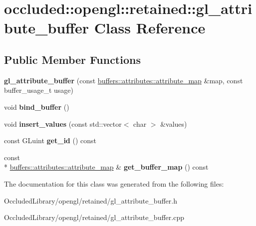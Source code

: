 \hypertarget{classoccluded_1_1opengl_1_1retained_1_1gl__attribute__buffer}{\section{occluded\+:\+:opengl\+:\+:retained\+:\+:gl\+\_\+attribute\+\_\+buffer Class Reference}
\label{classoccluded_1_1opengl_1_1retained_1_1gl__attribute__buffer}
}
\subsection*{Public Member Functions}
\begin{DoxyCompactItemize}
\item 
\hypertarget{classoccluded_1_1opengl_1_1retained_1_1gl__attribute__buffer_afde90951c4cebabd6a6d80e5a7027cf0}{{\bfseries gl\+\_\+attribute\+\_\+buffer} (const \hyperlink{classoccluded_1_1buffers_1_1attributes_1_1attribute__map}{buffers\+::attributes\+::attribute\+\_\+map} \&map, const buffer\+\_\+usage\+\_\+t usage)}\label{classoccluded_1_1opengl_1_1retained_1_1gl__attribute__buffer_afde90951c4cebabd6a6d80e5a7027cf0}

\item 
\hypertarget{classoccluded_1_1opengl_1_1retained_1_1gl__attribute__buffer_ab9c701de489d6e8b7ece70f4ffd50ca1}{void {\bfseries bind\+\_\+buffer} ()}\label{classoccluded_1_1opengl_1_1retained_1_1gl__attribute__buffer_ab9c701de489d6e8b7ece70f4ffd50ca1}

\item 
\hypertarget{classoccluded_1_1opengl_1_1retained_1_1gl__attribute__buffer_a07b2603386742c0f9b3d0115842b5ed5}{void {\bfseries insert\+\_\+values} (const std\+::vector$<$ char $>$ \&values)}\label{classoccluded_1_1opengl_1_1retained_1_1gl__attribute__buffer_a07b2603386742c0f9b3d0115842b5ed5}

\item 
\hypertarget{classoccluded_1_1opengl_1_1retained_1_1gl__attribute__buffer_ac2c3be30814ed6daec32533aacf8e52b}{const G\+Luint {\bfseries get\+\_\+id} () const }\label{classoccluded_1_1opengl_1_1retained_1_1gl__attribute__buffer_ac2c3be30814ed6daec32533aacf8e52b}

\item 
\hypertarget{classoccluded_1_1opengl_1_1retained_1_1gl__attribute__buffer_a812a8329c763d45760128b71fa76c5e7}{const \\*
\hyperlink{classoccluded_1_1buffers_1_1attributes_1_1attribute__map}{buffers\+::attributes\+::attribute\+\_\+map} \& {\bfseries get\+\_\+buffer\+\_\+map} () const }\label{classoccluded_1_1opengl_1_1retained_1_1gl__attribute__buffer_a812a8329c763d45760128b71fa76c5e7}

\end{DoxyCompactItemize}


The documentation for this class was generated from the following files\+:\begin{DoxyCompactItemize}
\item 
Occluded\+Library/opengl/retained/gl\+\_\+attribute\+\_\+buffer.\+h\item 
Occluded\+Library/opengl/retained/gl\+\_\+attribute\+\_\+buffer.\+cpp\end{DoxyCompactItemize}
